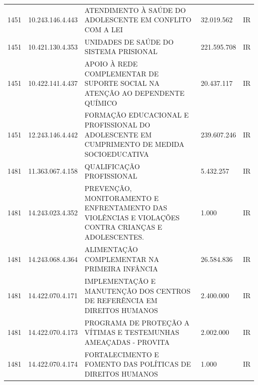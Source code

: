 \documentclass{article}
\begin{document}
\begin{longtable}[c]{m{1cm}|m{2cm}|m{10cm}|m{2cm}|m{1cm}}
\multicolumn{1}{C{1cm}|}{1451} & \multicolumn{1}{C{2cm}|}{10.243.146.4.443} & \multicolumn{1}{L{10cm}|}{ATENDIMENTO À SAÚDE DO ADOLESCENTE EM CONFLITO COM A LEI} & \multicolumn{1}{R{2cm}|}{32.019.562} & \multicolumn{1}{C{1cm}}{IR} \\
\multicolumn{1}{C{1cm}|}{1451} & \multicolumn{1}{C{2cm}|}{10.421.130.4.353} & \multicolumn{1}{L{10cm}|}{UNIDADES DE SAÚDE DO SISTEMA PRISIONAL} & \multicolumn{1}{R{2cm}|}{221.595.708} & \multicolumn{1}{C{1cm}}{IR} \\
\multicolumn{1}{C{1cm}|}{1451} & \multicolumn{1}{C{2cm}|}{10.422.141.4.437} & \multicolumn{1}{L{10cm}|}{APOIO À REDE COMPLEMENTAR DE SUPORTE SOCIAL NA ATENÇÃO AO DEPENDENTE QUÍMICO} & \multicolumn{1}{R{2cm}|}{20.437.117} & \multicolumn{1}{C{1cm}}{IR} \\
\multicolumn{1}{C{1cm}|}{1451} & \multicolumn{1}{C{2cm}|}{12.243.146.4.442} & \multicolumn{1}{L{10cm}|}{FORMAÇÃO EDUCACIONAL E PROFISSIONAL DO ADOLESCENTE EM CUMPRIMENTO DE MEDIDA SOCIOEDUCATIVA} & \multicolumn{1}{R{2cm}|}{239.607.246} & \multicolumn{1}{C{1cm}}{IR} \\
\multicolumn{1}{C{1cm}|}{1481} & \multicolumn{1}{C{2cm}|}{11.363.067.4.158} & \multicolumn{1}{L{10cm}|}{QUALIFICAÇÃO PROFISSIONAL} & \multicolumn{1}{R{2cm}|}{5.432.257} & \multicolumn{1}{C{1cm}}{IR} \\
\multicolumn{1}{C{1cm}|}{1481} & \multicolumn{1}{C{2cm}|}{14.243.023.4.352} & \multicolumn{1}{L{10cm}|}{PREVENÇÃO, MONITORAMENTO E ENFRENTAMENTO DAS VIOLÊNCIAS E VIOLAÇÕES CONTRA CRIANÇAS E ADOLESCENTES.} & \multicolumn{1}{R{2cm}|}{1.000} & \multicolumn{1}{C{1cm}}{IR} \\
\multicolumn{1}{C{1cm}|}{1481} & \multicolumn{1}{C{2cm}|}{14.243.068.4.364} & \multicolumn{1}{L{10cm}|}{ALIMENTAÇÃO COMPLEMENTAR NA PRIMEIRA INFÂNCIA} & \multicolumn{1}{R{2cm}|}{26.584.836} & \multicolumn{1}{C{1cm}}{IR} \\
\multicolumn{1}{C{1cm}|}{1481} & \multicolumn{1}{C{2cm}|}{14.422.070.4.171} & \multicolumn{1}{L{10cm}|}{IMPLEMENTAÇÃO E MANUTENÇÃO DOS CENTROS DE REFERÊNCIA EM DIREITOS HUMANOS} & \multicolumn{1}{R{2cm}|}{2.400.000} & \multicolumn{1}{C{1cm}}{IR} \\
\multicolumn{1}{C{1cm}|}{1481} & \multicolumn{1}{C{2cm}|}{14.422.070.4.173} & \multicolumn{1}{L{10cm}|}{PROGRAMA DE PROTEÇÃO A VÍTIMAS E TESTEMUNHAS AMEAÇADAS - PROVITA} & \multicolumn{1}{R{2cm}|}{2.002.000} & \multicolumn{1}{C{1cm}}{IR} \\
\multicolumn{1}{C{1cm}|}{1481} & \multicolumn{1}{C{2cm}|}{14.422.070.4.174} & \multicolumn{1}{L{10cm}|}{FORTALECIMENTO E FOMENTO DAS POLÍTICAS DE DIREITOS HUMANOS} & \multicolumn{1}{R{2cm}|}{1.000} & \multicolumn{1}{C{1cm}}{IR} \\

\end{longtable}
\end{document}
